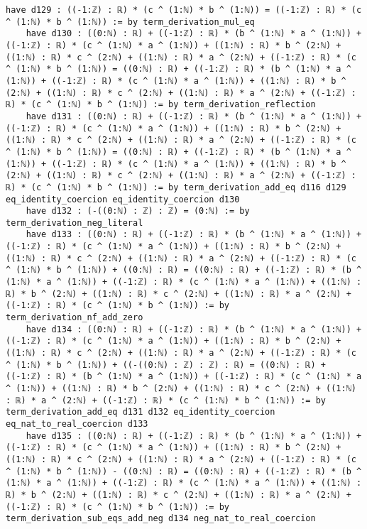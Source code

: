 \documentclass{article}
\begin{document}
\begin{tcolorbox}[colback=white!10, width=\linewidth]
\begin{lstlisting}[language=Lean4]
    have d129 : ((-1:ℤ) : ℝ) * (c ^ (1:ℕ) * b ^ (1:ℕ)) = ((-1:ℤ) : ℝ) * (c ^ (1:ℕ) * b ^ (1:ℕ)) := by term_derivation_mul_eq
    have d130 : ((0:ℕ) : ℝ) + ((-1:ℤ) : ℝ) * (b ^ (1:ℕ) * a ^ (1:ℕ)) + ((-1:ℤ) : ℝ) * (c ^ (1:ℕ) * a ^ (1:ℕ)) + ((1:ℕ) : ℝ) * b ^ (2:ℕ) + ((1:ℕ) : ℝ) * c ^ (2:ℕ) + ((1:ℕ) : ℝ) * a ^ (2:ℕ) + ((-1:ℤ) : ℝ) * (c ^ (1:ℕ) * b ^ (1:ℕ)) = ((0:ℕ) : ℝ) + ((-1:ℤ) : ℝ) * (b ^ (1:ℕ) * a ^ (1:ℕ)) + ((-1:ℤ) : ℝ) * (c ^ (1:ℕ) * a ^ (1:ℕ)) + ((1:ℕ) : ℝ) * b ^ (2:ℕ) + ((1:ℕ) : ℝ) * c ^ (2:ℕ) + ((1:ℕ) : ℝ) * a ^ (2:ℕ) + ((-1:ℤ) : ℝ) * (c ^ (1:ℕ) * b ^ (1:ℕ)) := by term_derivation_reflection
    have d131 : ((0:ℕ) : ℝ) + ((-1:ℤ) : ℝ) * (b ^ (1:ℕ) * a ^ (1:ℕ)) + ((-1:ℤ) : ℝ) * (c ^ (1:ℕ) * a ^ (1:ℕ)) + ((1:ℕ) : ℝ) * b ^ (2:ℕ) + ((1:ℕ) : ℝ) * c ^ (2:ℕ) + ((1:ℕ) : ℝ) * a ^ (2:ℕ) + ((-1:ℤ) : ℝ) * (c ^ (1:ℕ) * b ^ (1:ℕ)) = ((0:ℕ) : ℝ) + ((-1:ℤ) : ℝ) * (b ^ (1:ℕ) * a ^ (1:ℕ)) + ((-1:ℤ) : ℝ) * (c ^ (1:ℕ) * a ^ (1:ℕ)) + ((1:ℕ) : ℝ) * b ^ (2:ℕ) + ((1:ℕ) : ℝ) * c ^ (2:ℕ) + ((1:ℕ) : ℝ) * a ^ (2:ℕ) + ((-1:ℤ) : ℝ) * (c ^ (1:ℕ) * b ^ (1:ℕ)) := by term_derivation_add_eq d116 d129 eq_identity_coercion eq_identity_coercion d130
    have d132 : (-((0:ℕ) : ℤ) : ℤ) = (0:ℕ) := by term_derivation_neg_literal
    have d133 : ((0:ℕ) : ℝ) + ((-1:ℤ) : ℝ) * (b ^ (1:ℕ) * a ^ (1:ℕ)) + ((-1:ℤ) : ℝ) * (c ^ (1:ℕ) * a ^ (1:ℕ)) + ((1:ℕ) : ℝ) * b ^ (2:ℕ) + ((1:ℕ) : ℝ) * c ^ (2:ℕ) + ((1:ℕ) : ℝ) * a ^ (2:ℕ) + ((-1:ℤ) : ℝ) * (c ^ (1:ℕ) * b ^ (1:ℕ)) + ((0:ℕ) : ℝ) = ((0:ℕ) : ℝ) + ((-1:ℤ) : ℝ) * (b ^ (1:ℕ) * a ^ (1:ℕ)) + ((-1:ℤ) : ℝ) * (c ^ (1:ℕ) * a ^ (1:ℕ)) + ((1:ℕ) : ℝ) * b ^ (2:ℕ) + ((1:ℕ) : ℝ) * c ^ (2:ℕ) + ((1:ℕ) : ℝ) * a ^ (2:ℕ) + ((-1:ℤ) : ℝ) * (c ^ (1:ℕ) * b ^ (1:ℕ)) := by term_derivation_nf_add_zero
    have d134 : ((0:ℕ) : ℝ) + ((-1:ℤ) : ℝ) * (b ^ (1:ℕ) * a ^ (1:ℕ)) + ((-1:ℤ) : ℝ) * (c ^ (1:ℕ) * a ^ (1:ℕ)) + ((1:ℕ) : ℝ) * b ^ (2:ℕ) + ((1:ℕ) : ℝ) * c ^ (2:ℕ) + ((1:ℕ) : ℝ) * a ^ (2:ℕ) + ((-1:ℤ) : ℝ) * (c ^ (1:ℕ) * b ^ (1:ℕ)) + ((-((0:ℕ) : ℤ) : ℤ) : ℝ) = ((0:ℕ) : ℝ) + ((-1:ℤ) : ℝ) * (b ^ (1:ℕ) * a ^ (1:ℕ)) + ((-1:ℤ) : ℝ) * (c ^ (1:ℕ) * a ^ (1:ℕ)) + ((1:ℕ) : ℝ) * b ^ (2:ℕ) + ((1:ℕ) : ℝ) * c ^ (2:ℕ) + ((1:ℕ) : ℝ) * a ^ (2:ℕ) + ((-1:ℤ) : ℝ) * (c ^ (1:ℕ) * b ^ (1:ℕ)) := by term_derivation_add_eq d131 d132 eq_identity_coercion eq_nat_to_real_coercion d133
    have d135 : ((0:ℕ) : ℝ) + ((-1:ℤ) : ℝ) * (b ^ (1:ℕ) * a ^ (1:ℕ)) + ((-1:ℤ) : ℝ) * (c ^ (1:ℕ) * a ^ (1:ℕ)) + ((1:ℕ) : ℝ) * b ^ (2:ℕ) + ((1:ℕ) : ℝ) * c ^ (2:ℕ) + ((1:ℕ) : ℝ) * a ^ (2:ℕ) + ((-1:ℤ) : ℝ) * (c ^ (1:ℕ) * b ^ (1:ℕ)) - ((0:ℕ) : ℝ) = ((0:ℕ) : ℝ) + ((-1:ℤ) : ℝ) * (b ^ (1:ℕ) * a ^ (1:ℕ)) + ((-1:ℤ) : ℝ) * (c ^ (1:ℕ) * a ^ (1:ℕ)) + ((1:ℕ) : ℝ) * b ^ (2:ℕ) + ((1:ℕ) : ℝ) * c ^ (2:ℕ) + ((1:ℕ) : ℝ) * a ^ (2:ℕ) + ((-1:ℤ) : ℝ) * (c ^ (1:ℕ) * b ^ (1:ℕ)) := by term_derivation_sub_eqs_add_neg d134 neg_nat_to_real_coercion

\end{lstlisting}
\end{tcolorbox}
\end{document}
